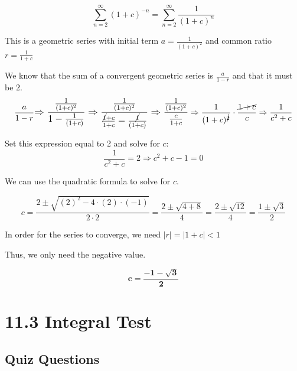 \documentclass[12pt]{article}
\begin{document}
\begin{solution}
$$\sum^{\infty}_{n=2} (1 + c)^{-n} = \sum^{\infty}_{n=2} \frac{1}{(1 + c)^n}$$

This is a geometric series with initial term $a= \frac{1}{(1 + c)^{2}}$ and common ratio $r = \frac{1}{1 + c}$

We know that the sum of a convergent geometric series is $\frac{a}{1 - r}$ and that it must be $2$.
$$ \frac{a}{1 - r} \mathlarger{\Rightarrow \frac{\frac{1}{(1 + c)^{2}}}{1 - \frac{1}{(1 + c)}} \Rightarrow \frac{\frac{1}{(1 + c)^{2}}}{\frac{\cancel{1} + c}{1 + c} - \frac{\cancel{1}}{(1 + c)}} \Rightarrow  \frac{\frac{1}{(1 + c)^{2}}}{\frac{c}{1 + c}}} \Rightarrow \frac{1}{(1 + c)^{\cancel{2}}} \cdot \frac{ \cancel{1 + c} }{c} \Rightarrow \frac{1}{c^2 + c}$$

Set this expression equal to 2 and solve for $c$:
$$ \frac{1}{c^2 + c} = 2 \Rightarrow c^2 + c - 1 = 0$$

We can use the quadratic formula to solve for $c$.

$$ c = \frac{2 \pm \sqrt{(2)^2 - 4 \cdot (2) \cdot (-1)}}{2 \cdot 2} = \frac{2 \pm \sqrt{4 + 8 }}{4} = \frac{2 \pm \sqrt{12}}{4}  = \frac{1 \pm \sqrt{3}}{2}$$

In order for the series to converge, we need $\left| r \right| = \left|1 + c \right| < 1$ 


Thus, we only need the negative value.

$$\mathbf{c = \frac{-1 - \sqrt{3}}{2}}$$
\end{solution}



\pagebreak 
\section*{11.3 Integral Test} 

\subsection*{Quiz Questions}
\end{document}
